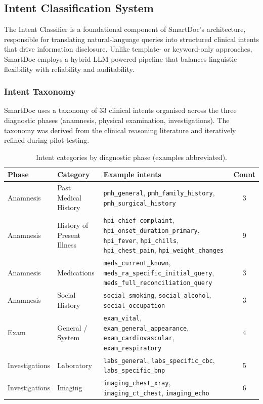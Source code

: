 \subsection{Intent Classification System}
\label{sec:intent_classifier}

The Intent Classifier is a foundational component of SmartDoc’s architecture,
responsible for translating natural-language queries into structured clinical
intents that drive information disclosure. Unlike template- or keyword-only
approaches, SmartDoc employs a hybrid LLM-powered pipeline that balances
linguistic flexibility with reliability and auditability.

\subsubsection{Intent Taxonomy}

SmartDoc uses a taxonomy of 33 clinical intents organised across the three
diagnostic phases (anamnesis, physical examination, investigations). The taxonomy
was derived from the clinical reasoning literature and iteratively refined during
pilot testing.

\begin{table}[h]
\centering
\caption{Intent categories by diagnostic phase (examples abbreviated).}
\label{tab:intent_taxonomy}
\setlength{\tabcolsep}{6pt}
\renewcommand{\arraystretch}{1.15}
\begin{tabular}{p{2.5cm} p{3.2cm} p{6.7cm} c}
\toprule
\textbf{Phase} & \textbf{Category} & \textbf{Example intents} & \textbf{Count} \\
\midrule
Anamnesis &
Past Medical History &
\texttt{pmh\_general}, \texttt{pmh\_family\_history}, \texttt{pmh\_surgical\_history} & 3 \\
Anamnesis &
History of Present Illness &
\texttt{hpi\_chief\_complaint}, \texttt{hpi\_onset\_duration\_primary}, \texttt{hpi\_fever}, \texttt{hpi\_chills}, \texttt{hpi\_chest\_pain}, \texttt{hpi\_weight\_changes} & 9 \\
Anamnesis &
Medications &
\texttt{meds\_current\_known}, \texttt{meds\_ra\_specific\_initial\_query}, \texttt{meds\_full\_reconciliation\_query} & 3 \\
Anamnesis &
Social History &
\texttt{social\_smoking}, \texttt{social\_alcohol}, \texttt{social\_occupation} & 3 \\
Exam &
General / System &
\texttt{exam\_vital}, \texttt{exam\_general\_appearance}, \texttt{exam\_cardiovascular}, \texttt{exam\_respiratory} & 4 \\
Investigations &
Laboratory &
\texttt{labs\_general}, \texttt{labs\_specific\_cbc}, \texttt{labs\_specific\_bnp} & 5 \\
Investigations &
Imaging &
\texttt{imaging\_chest\_xray}, \texttt{imaging\_ct\_chest}, \texttt{imaging\_echo} & 6 \\
\bottomrule
\end{tabular}
\end{table}

